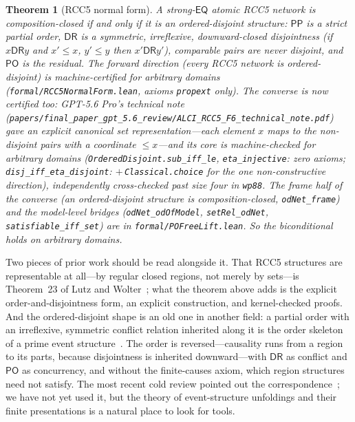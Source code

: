 \documentclass[11pt]{article}
\newcommand{\DR}{\mathsf{DR}}
\newcommand{\PO}{\mathsf{PO}}
\newcommand{\PP}{\mathsf{PP}}
\newcommand{\EQ}{\mathsf{EQ}}
\newcommand{\code}[1]{\texttt{#1}}
\theoremstyle{plain}
\newtheorem{theorem}{Theorem}
\theoremstyle{definition}
\begin{document}
\begin{theorem}[RCC5 normal form]\label{thm:normalform}
A strong-$\EQ$ atomic RCC5 network is composition-closed if and only if it
is an \emph{ordered-disjoint structure}: $\PP$ is a strict partial order,
$\DR$ is a symmetric, irreflexive, downward-closed disjointness (if
$x\mathbin{\DR}y$ and $x'\!\le\!x$, $y'\!\le\!y$ then
$x'\mathbin{\DR}y'$), comparable pairs are never disjoint, and $\PO$ is
the residual. The forward direction (every RCC5 network is
ordered-disjoint) is \emph{machine-certified for arbitrary domains}
(\texttt{formal/RCC5NormalForm.lean}, axioms \texttt{propext} only). The
\emph{converse} is now certified too: GPT-5.6 Pro's technical
note~\cite{GPT56TechNote}
(\texttt{papers/final\_paper\_gpt\_5.6\_review/ALCI\_RCC5\_F6\_technical\_note.pdf})
gave an explicit
\emph{canonical set representation}---each element $x$ maps to the
non-disjoint pairs with a coordinate ${\le}x$---and its core is machine-checked
for arbitrary domains (\code{OrderedDisjoint.sub\_iff\_le},
\code{eta\_injective}: \emph{zero} axioms; \code{disj\_iff\_eta\_disjoint}:
$+\,$\texttt{Classical.choice} for the one non-constructive direction),
independently cross-checked past size four in \texttt{wp88}. The frame
half of the converse (an ordered-disjoint structure is composition-closed,
\code{odNet\_frame}) and the model-level bridges (\code{odNet\_odOfModel},
\code{setRel\_odNet}, \code{satisfiable\_iff\_set}) are in
\texttt{formal/POFreeLift.lean}. So the biconditional holds on arbitrary
domains.
\end{theorem}

Two pieces of prior work should be read alongside it. That RCC5 structures
are representable at all---by regular closed regions, not merely by
sets---is Theorem~23 of Lutz and Wolter~\cite{LutzWolter2006}; what the
theorem above adds is the explicit order-and-disjointness form, an explicit
construction, and kernel-checked proofs. And the ordered-disjoint shape is an
old one in another field: a partial order with an irreflexive, symmetric
conflict relation inherited along it is the order skeleton of a prime event
structure~\cite{NielsenPlotkinWinskel1981}. The order is reversed---causality
runs from a region to its parts, because disjointness is inherited
downward---with $\DR$ as conflict and $\PO$ as concurrency, and without the
finite-causes axiom, which region structures need not satisfy. The most
recent cold review pointed out the correspondence~\cite{GPT56SolReview}; we
have not yet used it, but the theory of event-structure unfoldings and their
finite presentations is a natural place to look for tools.
\end{document}
